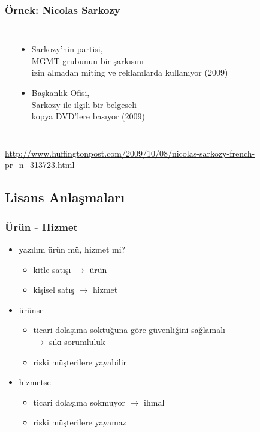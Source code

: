 \documentclass[dvipsnames]{beamer}
\theoremstyle{definition}
\theoremstyle{example}
\theoremstyle{plain}
\begin{document}
\begin{frame}
  \frametitle{Örnek: Nicolas Sarkozy}

  \begin{columns}
    \begin{center}
    \end{center}

    \begin{itemize}
      \item Sarkozy'nin partisi,\\
        MGMT grubunun bir şarkısını\\
        izin almadan miting ve reklamlarda kullanıyor (2009)
      \item Başkanlık Ofisi,\\
        Sarkozy ile ilgili bir belgeseli\\
        kopya DVD'lere basıyor (2009)
    \end{itemize}
  \end{columns}

  \medskip
  \tiny{\url{http://www.huffingtonpost.com/2009/10/08/nicolas-sarkozy-french-pr_n_313723.html}}\\
\end{frame}

\subsection{Lisans Anlaşmaları}

\begin{frame}
  \frametitle{Ürün - Hizmet}

  \begin{itemize}
    \item yazılım ürün mü, hizmet mi?
    \begin{itemize}
      \item kitle satışı $\rightarrow$ ürün
      \item kişisel satış $\rightarrow$ hizmet
    \end{itemize}

    \pause
    \medskip
    \item ürünse
    \begin{itemize}
      \item ticari dolaşıma soktuğuna göre güvenliğini sağlamalı\\
        $\rightarrow$ sıkı sorumluluk
      \item riski müşterilere yayabilir
    \end{itemize}

    \pause
    \item hizmetse
    \begin{itemize}
      \item ticari dolaşıma sokmuyor $\rightarrow$ ihmal
      \item riski müşterilere yayamaz
    \end{itemize}
  \end{itemize}
\end{frame}
\end{document}
